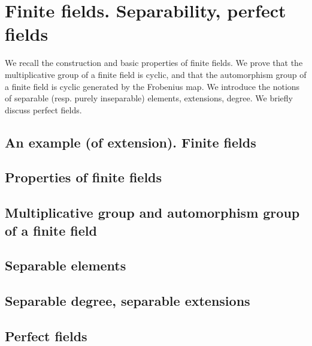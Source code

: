 \chapter{Finite fields. Separability, perfect fields}
We recall the construction and basic properties of finite fields. We
prove that the multiplicative group of a finite field is cyclic, and
that the automorphism group of a finite field is cyclic generated by
the Frobenius map. We introduce the notions of separable (resp. purely
inseparable) elements, extensions, degree. We briefly discuss perfect
fields.

\section{An example (of extension). Finite fields}
\section{Properties of finite fields}
\section{Multiplicative group and automorphism group of a finite field}
\section{Separable elements}
\section{Separable degree, separable extensions}
\section{Perfect fields}
